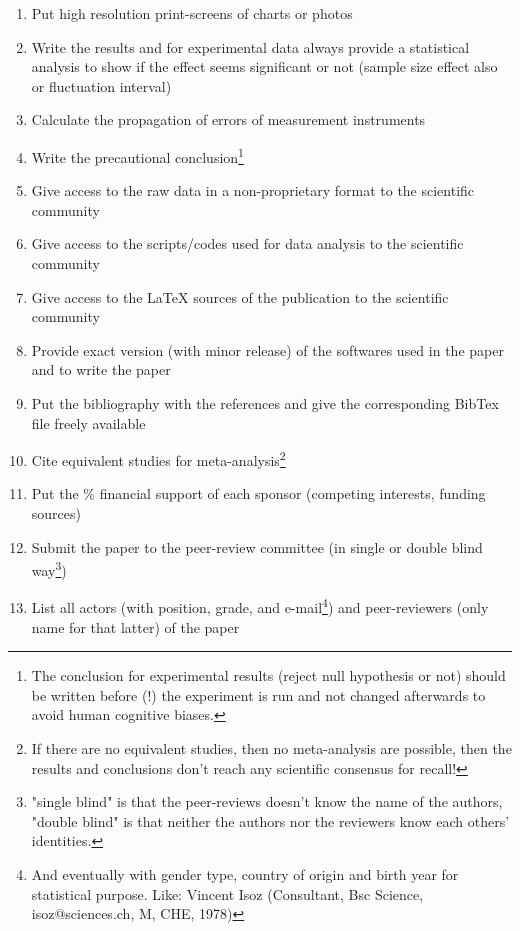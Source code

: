 \begin{enumerate}
		\item Put high resolution print-screens of charts or photos
		
		\item Write the results and for experimental data always provide a statistical analysis to show if the effect seems significant or not (sample size effect also or fluctuation interval)
		
		\item Calculate the propagation of errors of measurement instruments
		
		\item Write the precautional conclusion\footnote{The conclusion for experimental results (reject null hypothesis or not) should be written before (!) the experiment is run and not changed afterwards to avoid human cognitive biases.}
		
		\item Give access to the raw data in a non-proprietary format to the scientific community
		
		\item Give access to the scripts/codes used for data analysis to the scientific community
		
		\item Give access to the LaTeX sources of the publication to the scientific community
		
		\item Provide exact version (with minor release) of the softwares used in the paper and to write the paper
		
		\item Put the bibliography with the references and give the corresponding BibTex file freely available
		
		\item Cite equivalent studies for meta-analysis\footnote{If there are no equivalent studies, then no meta-analysis are possible, then the results and conclusions don't reach any scientific consensus for recall!}
		
		\item Put the \% financial support of each sponsor (competing interests, funding sources)
		
		\item Submit the paper to the peer-review committee (in single or double blind way\footnote{"single blind" is that the peer-reviews doesn't know the name of the authors, "double blind" is that neither the authors nor the reviewers know each others' identities.})
		
		\item List all actors (with position, grade, and e-mail\footnote{And eventually with gender type, country of origin and birth year for statistical purpose. Like: Vincent Isoz (Consultant, Bsc Science, isoz@sciences.ch, M, CHE, 1978)}) and peer-reviewers (only name for that latter) of the paper
	\end{enumerate}
